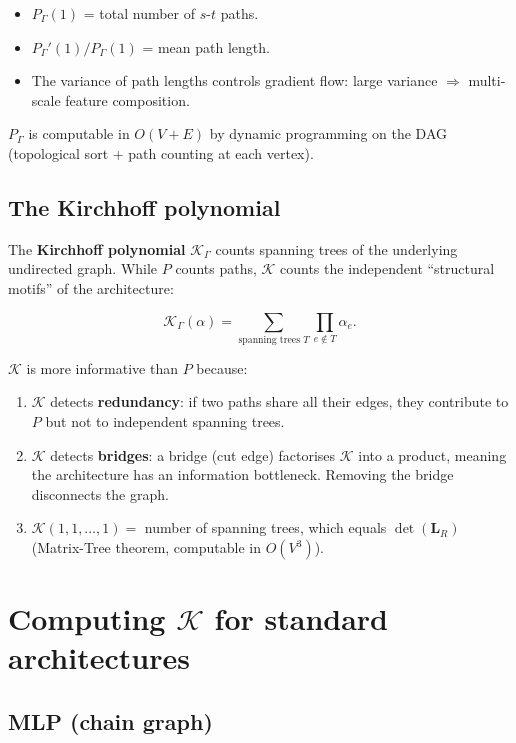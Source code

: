 \documentclass[11pt,a4paper]{article}
\newcommand{\K}{\mathcal{K}}
\begin{document}
\begin{itemize}
\item $P_\Gamma(1)$ = total number of $s$-$t$ paths.
\item $P_\Gamma'(1)/P_\Gamma(1)$ = mean path length.
\item The variance of path lengths controls gradient flow:
  large variance $\Rightarrow$ multi-scale feature composition.
\end{itemize}

$P_\Gamma$ is computable in $O(V + E)$ by dynamic programming
on the DAG (topological sort + path counting at each vertex).

\subsection{The Kirchhoff polynomial}

The \textbf{Kirchhoff polynomial} $\K_\Gamma$ counts spanning
trees of the underlying undirected graph.  While $P$ counts paths,
$\K$ counts the independent ``structural motifs'' of the architecture:

\begin{equation}
\K_\Gamma(\alpha) = \sum_{\text{spanning trees } T}
\prod_{e \notin T} \alpha_e.
\end{equation}

$\K$ is more informative than $P$ because:
\begin{enumerate}
\item $\K$ detects \textbf{redundancy}: if two paths share all their
  edges, they contribute to $P$ but not to independent spanning trees.
\item $\K$ detects \textbf{bridges}: a bridge (cut edge) factorises
  $\K$ into a product, meaning the architecture has an information
  bottleneck.  Removing the bridge disconnects the graph.
\item $\K(1, 1, \ldots, 1) = $ number of spanning trees, which
  equals $\det(\mathbf{L}_R)$ (Matrix-Tree theorem, computable in
  $O(V^3)$).
\end{enumerate}


\section{Computing $\K$ for standard architectures}

\subsection{MLP (chain graph)}
\end{document}

